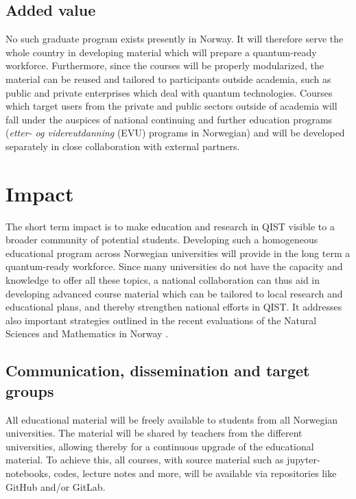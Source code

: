 \documentclass{scrreprt}
\begin{document}
\subsection{Added value}


No such graduate program exists presently in Norway. It will therefore
serve the whole country in developing material which will prepare a
quantum-ready workforce. Furthermore, since the courses will be
properly modularized, the material can be reused and tailored to
participants outside academia, such as public and private enterprises
which deal with quantum technologies. Courses which target users from
the private and public sectors outside of academia will fall under the
auspices of national continuing and further education programs (\textit{etter- og videreutdanning} (EVU)
programs in Norwegian) and will be developed separately in close
collaboration with external partners.

\section{Impact}


The short term impact is to make education and research in QIST
visible to a broader community of potential students. Developing such a homogeneous educational program across Norwegian universities will provide in the long term a quantum-ready workforce. Since many universities do not have the capacity and knowledge to offer all these topics, a national collaboration can thus aid in developing advanced course material which can be tailored to local research and educational plans, and thereby strengthen national efforts in QIST. It addresses also important strategies outlined in the recent evaluations of the Natural Sciences and Mathematics in Norway \cite{evalnat,evalmat}. 

\subsection{Communication, dissemination and target groups}

All educational material will be freely available to students from all
Norwegian universities. The material will be shared by teachers from
the different universities, allowing thereby for a continuous upgrade
of the educational material.  To achieve this, all courses, with
source material such as jupyter-notebooks, codes, lecture notes and more,
will be available via repositories like GitHub and/or GitLab.
\end{document}
